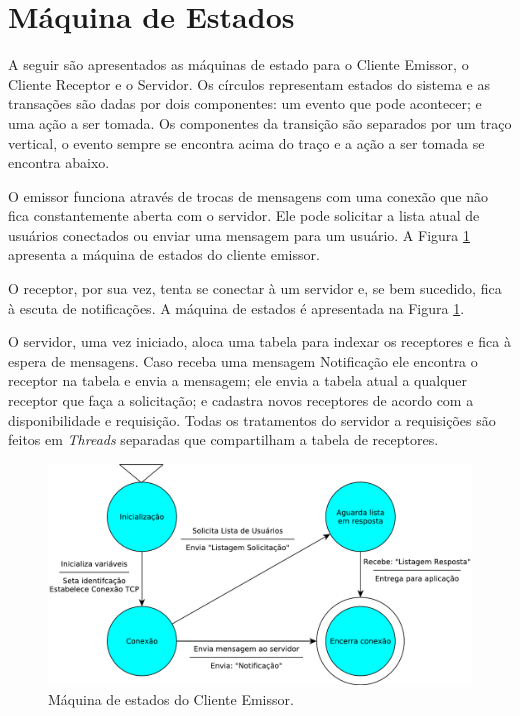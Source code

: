 \documentclass[12pt]{article}
\begin{document}
\section{Máquina de Estados}\label{sec:MaquinaDeEstados}

A seguir são apresentados as máquinas de estado para o
Cliente Emissor,
o Cliente Receptor e
o Servidor.
Os círculos representam estados do sistema e
as transações são dadas por dois componentes:
um evento que pode acontecer;
e uma ação a ser tomada.
Os componentes da transição são separados por um traço vertical,
o evento sempre se encontra acima do traço e
a ação a ser tomada se encontra abaixo.

O emissor funciona através de trocas de mensagens com uma conexão que não fica constantemente aberta com o servidor.
Ele pode solicitar a lista atual de usuários conectados ou enviar uma mensagem para um usuário.
A Figura \ref{fig:Emissor} apresenta a máquina de estados do cliente emissor.

O receptor, por sua vez, tenta se conectar à um servidor e,
se bem sucedido,
fica à escuta de notificações. A máquina de estados é apresentada na Figura \ref{fig:Emissor}.

O servidor, uma vez iniciado,
aloca uma tabela para indexar os receptores e fica à espera de mensagens.
Caso receba uma mensagem Notificação ele encontra o receptor na tabela e envia a mensagem;
ele envia a tabela atual a qualquer receptor que faça a solicitação;
e cadastra novos receptores de acordo com a disponibilidade e requisição.
Todas os tratamentos do servidor a requisições são feitos em {\it Threads} separadas que compartilham a tabela de receptores.

\begin{figure}%
	\centering
	\includegraphics[width=1\textwidth]{images/Protocolo_Cliente_Emissor.pdf}
	\caption{Máquina de estados do Cliente Emissor.}
	\label{fig:Emissor}
\end{figure}
\end{document}
